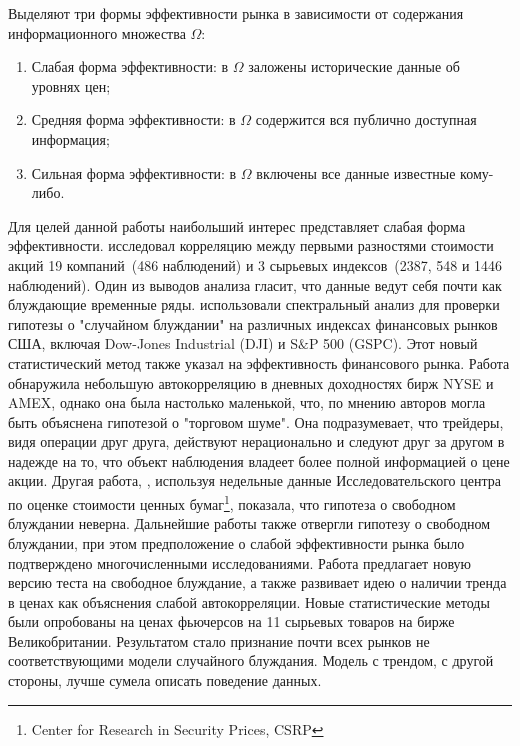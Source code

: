 \documentclass[a4paper,12pt]{article}
\begin{document}
Выделяют три формы эффективности рынка в зависимости от содержания информационного множества $\Omega$:
\begin{enumerate}
  \item Слабая форма эффективности: в $\Omega$ заложены исторические данные об уровнях цен;
  \item Средняя форма эффективности: в $\Omega$ содержится вся публично доступная информация;
  \item Сильная форма эффективности: в $\Omega$ включены все данные известные кому-либо.
\end{enumerate}

Для целей данной работы наибольший интерес представляет слабая форма эффективности. \cite{Kendall1953} исследовал корреляцию между первыми разностями стоимости акций 19 компаний~(486 наблюдений) и 3 сырьевых индексов~(2387, 548 и 1446 наблюдений). Один из выводов анализа гласит, что данные ведут себя почти как блуждающие временные ряды. \cite{Granger1963} использовали спектральный анализ для проверки гипотезы о "случайном блуждании" на различных индексах финансовых рынков США, включая Dow-Jones Industrial (DJI) и S$\&$P 500 (GSPC). Этот новый статистический метод также указал на эффективность финансового рынка. Работа \cite{French1986} обнаружила небольшую автокорреляцию в дневных доходностях бирж NYSE и AMEX, однако она была настолько маленькой, что, по мнению авторов могла быть объяснена гипотезой о "торговом шуме". Она подразумевает, что трейдеры, видя операции друг друга, действуют нерационально и следуют друг за другом в надежде на то, что объект наблюдения владеет более полной информацией о цене акции. Другая работа, \cite{Lo1987}, используя недельные данные Исследовательского центра по оценке стоимости ценных бумаг\footnote{Center for Research in Security Prices, CSRP}, показала, что гипотеза о свободном блуждании неверна. Дальнейшие работы также отвергли гипотезу о свободном блуждании, при этом предположение о слабой эффективности рынка было подтверждено многочисленными исследованиями. Работа \cite{Taylor1982} предлагает новую версию теста на свободное блуждание, а также развивает идею о наличии тренда в ценах как объяснения слабой автокорреляции. Новые статистические методы были опробованы на ценах фьючерсов на 11 сырьевых товаров на бирже Великобритании. Результатом стало признание почти всех рынков не соответствующими модели случайного блуждания. Модель с трендом, с другой стороны, лучше сумела описать поведение данных.
\end{document}
